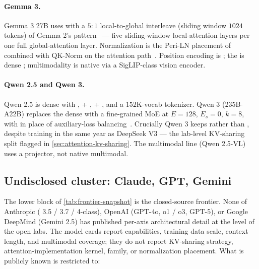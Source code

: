 \paragraph{Gemma 3.}
Gemma 3 27B uses  with a $5{:}1$ local-to-global interleave (sliding
window $1024$ tokens) of Gemma 2's pattern~\citep[\S 2.1]{gemma3} --- five
sliding-window local-attention layers per one full global-attention layer. Normalization
is the Peri-LN placement of \citet{peri-ln2025} combined with QK-Norm
on the attention path~\citep[\S 2.1]{gemma3,olmo2}. Position encoding
is ; the  is dense ; multimodality is native via a
SigLIP-class vision
encoder.

\paragraph{Qwen 2.5 and Qwen 3.}
Qwen 2.5 is dense  with ,  + ,  + , and
a $152$K-vocab  tokenizer. Qwen 3 (235B-A22B) replaces the dense  with
a fine-grained MoE at $E = 128$, $E_s = 0$, $k = 8$, with
 in place of auxiliary-loss
balancing~\citep[\S 2.1]{qwen3}. Crucially Qwen 3 keeps  rather
than , despite training in the same year as DeepSeek V3 --- the
lab-level KV-sharing split flagged in
\cref{sec:attention-kv-sharing}. The multimodal line (Qwen 2.5-VL)
uses a projector, not native multimodal.

\subsection{Undisclosed cluster: Claude, GPT, Gemini}
\label{sec:snapshot-undisclosed}

The lower block of \cref{tab:frontier-snapshot} is the closed-source
frontier. None of Anthropic ( 3.5 / 3.7 / 4-class), OpenAI
(GPT-4o, o1 / o3, GPT-5), or Google DeepMind (Gemini 2.5) has
published per-axis architectural detail at the level of the open
labs. The model cards report capabilities, training data scale,
context length, and multimodal coverage; they do not report
KV-sharing strategy, attention-implementation kernel,  family, or
normalization placement. What is publicly known is restricted to:

